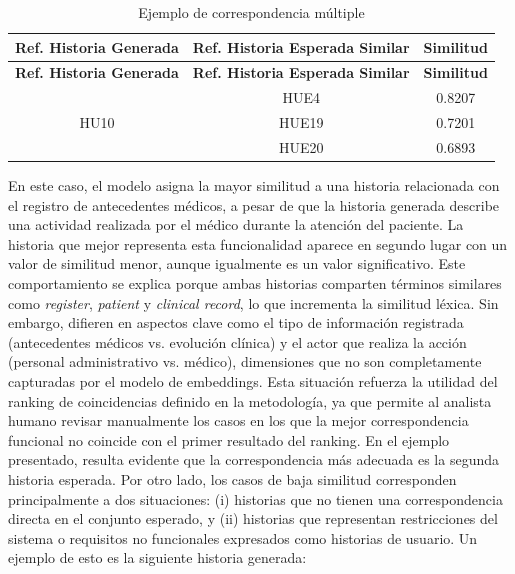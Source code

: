 \begin{longtable}{|c|c|c|}
\caption{Ejemplo de correspondencia múltiple}
\label{tab:granularity_example} \\
\hline
\textbf{Ref. Historia Generada} & \textbf{Ref. Historia Esperada Similar} & \textbf{Similitud} \\
\hline
\endfirsthead

\hline
\textbf{Ref. Historia Generada} & \textbf{Ref. Historia Esperada Similar} & \textbf{Similitud} \\
\hline
\endhead

\multirow{3}{*}{HU10} & HUE4 & 0.8207 \\
\cline{2-3}
     & HUE19 & 0.7201 \\
\cline{2-3}
     & HUE20 & 0.6893 \\
\hline

\end{longtable}

En este caso, el modelo asigna la mayor similitud a una historia relacionada con el registro de antecedentes médicos, a pesar de que la historia generada describe una actividad realizada por el médico durante la atención del paciente. La historia que mejor representa esta funcionalidad aparece en segundo lugar con un valor de similitud menor, aunque igualmente es un valor significativo.
Este comportamiento se explica porque ambas historias comparten términos similares como \textit{register}, \textit{patient} y \textit{clinical record}, lo que incrementa la similitud léxica. Sin embargo, difieren en aspectos clave como el tipo de información registrada (antecedentes médicos vs. evolución clínica) y el actor que realiza la acción (personal administrativo vs. médico), dimensiones que no son completamente capturadas por el modelo de embeddings.
Esta situación refuerza la utilidad del ranking de coincidencias definido en la metodología, ya que permite al analista humano revisar manualmente los casos en los que la mejor correspondencia funcional no coincide con el primer resultado del ranking. En el ejemplo presentado, resulta evidente que la correspondencia más adecuada es la segunda historia esperada.
Por otro lado, los casos de baja similitud corresponden principalmente a dos situaciones: (i) historias que no tienen una correspondencia directa en el conjunto esperado, y (ii) historias que representan restricciones del sistema o requisitos no funcionales expresados como historias de usuario.
Un ejemplo de esto es la siguiente historia generada:

